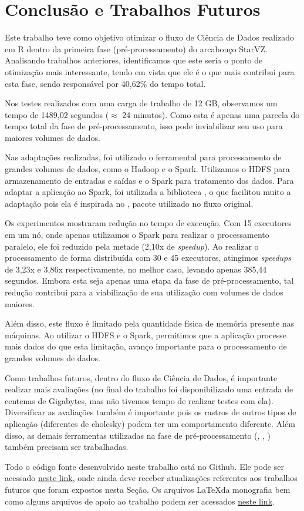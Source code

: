 \chapter{Conclusão e Trabalhos Futuros} \label{ch:conclusion}

Este trabalho teve como objetivo otimizar o fluxo de Ciência de Dados realizado 
em R dentro da primeira fase (pré-processamento) do arcabouço StarVZ. 
Analisando trabalhos anteriores, identificamos que este seria o ponto de 
otimização mais interessante, tendo em vista que ele é o que mais contribui 
para esta fase, sendo responsável por 40,62\% do tempo total.

Nos testes realizados com uma carga de trabalho de 12 GB, observamos um tempo 
de 1489,02 segundos ($\approx$ 24 minutos). Como esta é apenas uma parcela do 
tempo total da fase de pré-processamento, isso pode inviabilizar seu uso para 
maiores volumes de dados.

Nas adaptações realizadas, foi utilizado o ferramental para processamento de 
grandes volumes de dados, como o Hadoop e o Spark. Utilizamos o HDFS para 
armazenamento de entradas e saídas e o Spark para tratamento dos dados. Para 
adaptar a aplicação ao Spark, foi utilizada a biblioteca , o 
que facilitou muito a adaptação pois ela é inspirada no 
, pacote utilizado no fluxo original.

Os experimentos mostraram redução no tempo de execução. Com 15 executores 
em um nó, onde apenas utilizamos o Spark para realizar o 
processamento paralelo, ele foi reduzido pela metade (2,10x de \emph{speedup}). 
Ao realizar o processamento de forma distribuída com 30 e 45 executores, 
atingimos \emph{speedups} de 3,23x e 3,86x respectivamente, no melhor caso, 
levando apenas 385,44 segundos. Embora esta seja apenas uma etapa da fase de 
pré-processamento, tal redução contribui para a viabilização de sua utilização 
com volumes de dados maiores.

Além disso, este fluxo é limitado pela quantidade física de memória presente 
nas máquinas. Ao utilizar o HDFS e o Spark, permitimos que a aplicação processe 
mais dados do que esta limitação, avanço importante para o processamento de 
grandes volumes de dados.

Como trabalhos futuros, dentro do fluxo de Ciência de Dados, é importante 
realizar mais avaliações (no final do trabalho foi disponibilizado uma entrada 
de centenas de Gigabytes, mas não tivemos tempo de realizar testes com ela). 
Diversificar as avaliações também é importante pois os rastros de outros tipos 
de aplicação (diferentes de cholesky) podem ter um comportamento diferente. 
Além disso, as demais ferramentas utilizadas na fase de pré-processamento 
(, , ) também 
precisam ser trabalhadas.

Todo o código fonte desenvolvido neste trabalho está no Github. Ele pode ser 
acessado \href{https://github.com/aksmiyazaki/starvz/tree/spark_starvz}{neste 
link}, onde ainda deve receber atualizações referentes aos trabalhos futuros 
que foram expostos nesta Seção. Os arquivos \LaTeX da monografia bem como 
alguns arquivos de apoio ao trabalho podem ser acessados \href{https://github.com/aksmiyazaki/tcc-spec}{neste link}.